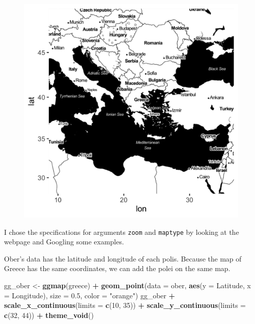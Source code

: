 \documentclass[]{book}
\newenvironment{Shaded}{\begin{snugshade}}{\end{snugshade}}
\newcommand{\KeywordTok}[1]{\textcolor[rgb]{0.13,0.29,0.53}{\textbf{#1}}}
\newcommand{\DataTypeTok}[1]{\textcolor[rgb]{0.13,0.29,0.53}{#1}}
\newcommand{\DecValTok}[1]{\textcolor[rgb]{0.00,0.00,0.81}{#1}}
\newcommand{\FloatTok}[1]{\textcolor[rgb]{0.00,0.00,0.81}{#1}}
\newcommand{\StringTok}[1]{\textcolor[rgb]{0.31,0.60,0.02}{#1}}
\newcommand{\OperatorTok}[1]{\textcolor[rgb]{0.81,0.36,0.00}{\textbf{#1}}}
\newcommand{\NormalTok}[1]{#1}
\theoremstyle{definition}
\theoremstyle{definition}
\theoremstyle{definition}
\theoremstyle{remark}
\begin{document}
\begin{figure}
\centering
\includegraphics{images/ober_ggmap_default.png}
\caption{}
\end{figure}

I chose the specifications for arguments \texttt{zoom} and
\texttt{maptype} by looking at the webpage and Googling some examples.

Ober's data has the latitude and longitude of each polis. Because the
map of Greece has the same coordinates, we can add the polei on the same
map.

\begin{Shaded}
\begin{Highlighting}[]
\NormalTok{gg_ober <-}\StringTok{ }\KeywordTok{ggmap}\NormalTok{(greece) }\OperatorTok{+}
\StringTok{  }\KeywordTok{geom_point}\NormalTok{(}\DataTypeTok{data =}\NormalTok{ ober, }
             \KeywordTok{aes}\NormalTok{(}\DataTypeTok{y =}\NormalTok{ Latitude, }\DataTypeTok{x =}\NormalTok{ Longitude), }
             \DataTypeTok{size =} \FloatTok{0.5}\NormalTok{,}
             \DataTypeTok{color =} \StringTok{"orange"}\NormalTok{)}
\NormalTok{gg_ober }\OperatorTok{+}\StringTok{ }
\StringTok{  }\KeywordTok{scale_x_continuous}\NormalTok{(}\DataTypeTok{limits =} \KeywordTok{c}\NormalTok{(}\DecValTok{10}\NormalTok{, }\DecValTok{35}\NormalTok{)) }\OperatorTok{+}\StringTok{ }
\StringTok{  }\KeywordTok{scale_y_continuous}\NormalTok{(}\DataTypeTok{limits =} \KeywordTok{c}\NormalTok{(}\DecValTok{32}\NormalTok{, }\DecValTok{44}\NormalTok{)) }\OperatorTok{+}
\StringTok{  }\KeywordTok{theme_void}\NormalTok{()}
\end{Highlighting}
\end{Shaded}
\end{document}
